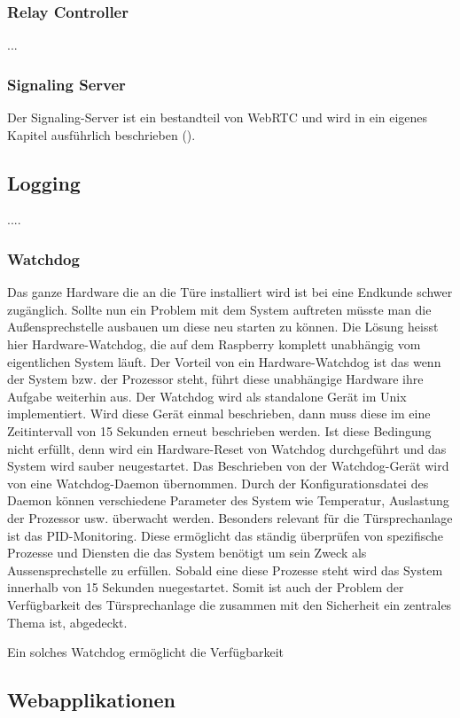 \subsubsection{Relay Controller}
...
\subsubsection{Signaling Server}
Der Signaling-Server ist ein bestandteil von WebRTC und wird in ein eigenes Kapitel ausführlich beschrieben ().

\subsection{Logging}
\label{kap:logs}
....

\subsubsection{Watchdog}
Das ganze Hardware die an die Türe installiert wird ist bei eine Endkunde schwer zugänglich. Sollte nun ein Problem mit dem System auftreten müsste man die Außensprechstelle ausbauen um diese neu starten zu können. Die Lösung heisst hier Hardware-Watchdog, die auf dem Raspberry komplett unabhängig vom eigentlichen System läuft. Der Vorteil von ein Hardware-Watchdog ist das wenn der System bzw. der Prozessor steht, führt diese unabhängige Hardware ihre Aufgabe weiterhin aus.
Der Watchdog wird als standalone Gerät im Unix implementiert. Wird diese Gerät einmal beschrieben, dann muss diese im eine Zeitintervall von 15 Sekunden erneut beschrieben werden. Ist diese Bedingung nicht erfüllt, denn wird ein Hardware-Reset von Watchdog durchgeführt und das System wird sauber neugestartet.
Das Beschrieben von der Watchdog-Gerät wird von eine Watchdog-Daemon übernommen. 
Durch der Konfigurationsdatei des Daemon können verschiedene Parameter des System wie Temperatur, Auslastung der Prozessor usw. überwacht werden. Besonders relevant für die Türsprechanlage ist das PID-Monitoring. Diese ermöglicht das ständig überprüfen von spezifische Prozesse und Diensten die das System benötigt um sein Zweck als Aussensprechstelle zu erfüllen. Sobald eine diese Prozesse steht wird das System innerhalb von 15 Sekunden nuegestartet. 
Somit ist auch der Problem der Verfügbarkeit des Türsprechanlage die zusammen mit den Sicherheit ein zentrales Thema ist, abgedeckt. 

Ein solches Watchdog ermöglicht die Verfügbarkeit 
\subsection{Webapplikationen}
\label{kap:webapp}


